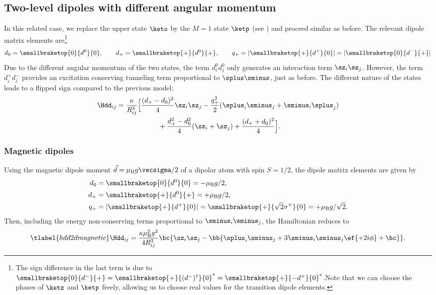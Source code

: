 \subsection{Two-level dipoles with different angular momentum}
In this related case, we replace the upper state $\keto$ by the $M=1$ state $\ketp$ (see ) and proceed similar as before.
The relevant dipole matrix elements are\footnote{The sign difference in the last term is due to $\smallbraketop{0}{d^-}{+} = \smallbraketop{+}{(d^-)^\dag}{0}^* = \smallbraketop{+}{- d^+}{0}^*$.Note that we can choose the phases of $\ketz$ and $\ketp$ freely, allowing us to choose real values for the transition dipole elements.}
\begin{align}
    d_0 = \smallbraketop{0}{d^0}{0},\qquad
    d_+ = \smallbraketop{+}{d^0}{+},\qquad
    q_+ = |\smallbraketop{+}{d^+}{0}| = |\smallbraketop{0}{d^-}{+}|
\end{align}
Due to the different angular momentum of the two states, the term $d^0_i d^0_j$ only generates an interaction term $\sz_i \sz_j$. However, the term $d^+_i d^-_j$ provides an excitation conserving tunneling term proportional to $\splus\sminus$, just as before. The different nature of the states leads to a flipped sign compared to the previous model:
\begin{align}
    \Hdd_{ij} &= \frac{\kappa}{R_{ij}^3} \Big[ \frac{(d_+-d_0)^2}{4} \sz_i \sz_j  - \frac{q_+^2}{2} (\splus_i \sminus_j + \sminus_i \splus_j) \\
              &\qquad\qquad\qquad + \frac{d_+^2 - d_0^2}{4} (\sz_i + \sz_j)  + \frac{(d_++d_0)^2}{4} \Big].
\end{align}

\subsubsection{Magnetic dipoles}
Using the magnetic dipole moment $\vec{d}=\mu_\text{B} g \vecsigma / 2$ of a dipolar atom with spin $S=1/2$,
the dipole matrix elements are given by
\begin{align}
    d_0 &= \smallbraketop{0}{d^0}{0} = -\mu_\text{B}g/2, \vphantom{\sqrt{2}} \\
    d_+ &= \smallbraketop{+}{d^0}{+} = +\mu_\text{B}g/2, \vphantom{\sqrt{2}} \\
    q_+ &= |\smallbraketop{+}{d^+}{0}| = \smallbraketop{+}{\sqrt{2} \sigma^+}{0} = +\mu_\text{B}g/\sqrt{2}.
\end{align}
Then, including the energy non-conserving terms proportional to $\sminus_i\sminus_j$, the Hamiltonian reduces to
\begin{align} \tlabel{hdd2dmagnetic}
    \Hdd_{ij} = \frac{\kappa \mu_\text{B}^2 g^2}{4 R_{ij}^3} \bc{ \sz_i \sz_j - \bb{\splus_i \sminus_j+ 3 \sminus_i\sminus_j \ef{+2i\phi} + \hc } }.
\end{align}

